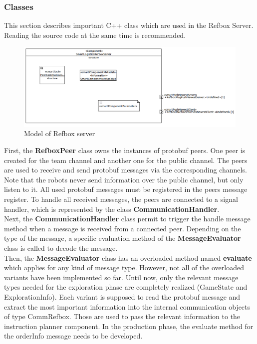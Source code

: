 \subsubsection{Classes}

This section describes important C++ class which are used in the Refbox Server. Reading the source code at the same time is recommended.\\

\begin{figure}[!h]
\centering
\includegraphics[width=\linewidth]{pic/component_refbox_server.png}
\caption{Model of Refbox server}
\label{fig:modelRefboxServer}
\end{figure}

First, the \textbf{RefboxPeer} class owns the instances of protobuf peers. One peer is created for the team channel and another one for the public channel. The peers are used to receive and send protobuf messages via the corresponding channels. Note that the robots never send information over the public channel, but only listen to it. All used protobuf messages must be registered in the peers message register. To handle all received messages, the peers are connected to a signal handler, which is represented by the class \textbf{CommunicationHandler}. \\

Next, the \textbf{CommunicationHandler} class permit to trigger the handle message method when a message is received from a connected peer. Depending on the type of the message, a specific evaluation method of the \textbf{MessageEvaluator} class is called to decode the message.\\

Then, the \textbf{MessageEvaluator} class has an overloaded method named \textbf{evaluate} which applies for any kind of message type. However, not all of the overloaded variants have been implemented so far. Until now, only the relevant message types needed for the exploration phase are completely realized (GameState and ExplorationInfo). Each variant is supposed to read the protobuf message and extract the most important information into the internal communication objects of type CommRefbox. Those are used to pass the relevant information to the instruction planner component. In the production phase, the evaluate method for the orderInfo message needs to be developed.\\

